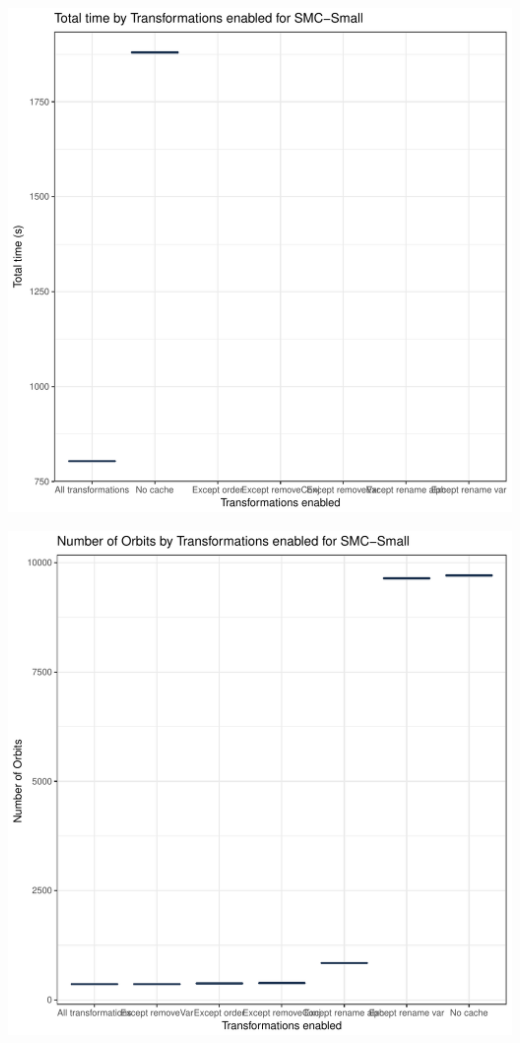 \documentclass{article}\usepackage[]{graphicx}\usepackage[]{color}
\makeatletter
\def\maxwidth{ %
  \ifdim\Gin@nat@width>\linewidth
    \linewidth
  \else
    \Gin@nat@width
  \fi
}
\newenvironment{knitrout}{}{} %
\makeatother
\begin{document}
\begin{knitrout}
\includegraphics[width=\maxwidth]{figure/small-3} 

\includegraphics[width=\maxwidth]{figure/small-4} 

\end{knitrout}
\end{document}
